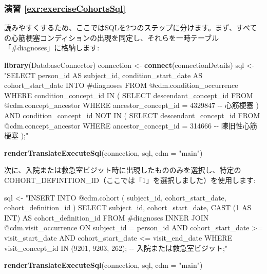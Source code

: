 \documentclass[
  11pt]{book}
\newenvironment{Shaded}{\begin{snugshade}}{\end{snugshade}}
\newcommand{\AttributeTok}[1]{\textcolor[rgb]{0.13,0.29,0.53}{#1}}
\newcommand{\FunctionTok}[1]{\textcolor[rgb]{0.13,0.29,0.53}{\textbf{#1}}}
\newcommand{\NormalTok}[1]{#1}
\newcommand{\OtherTok}[1]{\textcolor[rgb]{0.56,0.35,0.01}{#1}}
\newcommand{\StringTok}[1]{\textcolor[rgb]{0.31,0.60,0.02}{#1}}
\theoremstyle{definition}
\theoremstyle{definition}
\theoremstyle{definition}
\theoremstyle{definition}
\theoremstyle{remark}
\begin{document}
\subsubsection*{演習 \ref{exr:exerciseCohortsSql}}\label{ux6f14ux7fd2-refexrexercisecohortssql}

読みやすくするため、ここではSQLを2つのステップに分けます。まず、すべての心筋梗塞コンディションの出現を同定し、それらを一時テーブル「\#diagnoses」に格納します:

\begin{Shaded}
\begin{Highlighting}[]
\FunctionTok{library}\NormalTok{(DatabaseConnector)}
\NormalTok{connection }\OtherTok{\textless{}{-}} \FunctionTok{connect}\NormalTok{(connectionDetails)}
\NormalTok{sql }\OtherTok{\textless{}{-}} \StringTok{"SELECT person\_id AS subject\_id,}
\StringTok{  condition\_start\_date AS cohort\_start\_date}
\StringTok{INTO \#diagnoses}
\StringTok{FROM @cdm.condition\_occurrence}
\StringTok{WHERE condition\_concept\_id IN (}
\StringTok{    SELECT descendant\_concept\_id}
\StringTok{    FROM @cdm.concept\_ancestor}
\StringTok{    WHERE ancestor\_concept\_id = 4329847 {-}{-} 心筋梗塞}
\StringTok{)}
\StringTok{  AND condition\_concept\_id NOT IN (}
\StringTok{    SELECT descendant\_concept\_id}
\StringTok{    FROM @cdm.concept\_ancestor}
\StringTok{    WHERE ancestor\_concept\_id = 314666 {-}{-} 陳旧性心筋梗塞}
\StringTok{);"}

\FunctionTok{renderTranslateExecuteSql}\NormalTok{(connection, sql, }\AttributeTok{cdm =} \StringTok{"main"}\NormalTok{)}
\end{Highlighting}
\end{Shaded}

次に、入院または救急室ビジット時に出現したもののみを選択し、特定のCOHORT\_DEFINITION\_ID（ここでは「1」を選択しました）を使用します:

\begin{Shaded}
\begin{Highlighting}[]
\NormalTok{sql }\OtherTok{\textless{}{-}} \StringTok{"INSERT INTO @cdm.cohort (}
\StringTok{  subject\_id,}
\StringTok{  cohort\_start\_date,}
\StringTok{  cohort\_definition\_id}
\StringTok{  )}
\StringTok{SELECT subject\_id,}
\StringTok{  cohort\_start\_date,}
\StringTok{  CAST (1 AS INT) AS cohort\_definition\_id}
\StringTok{FROM \#diagnoses}
\StringTok{INNER JOIN @cdm.visit\_occurrence}
\StringTok{  ON subject\_id = person\_id}
\StringTok{    AND cohort\_start\_date \textgreater{}= visit\_start\_date}
\StringTok{    AND cohort\_start\_date \textless{}= visit\_end\_date}
\StringTok{WHERE visit\_concept\_id IN (9201, 9203, 262); {-}{-} 入院または救急室ビジット;"}

\FunctionTok{renderTranslateExecuteSql}\NormalTok{(connection, sql, }\AttributeTok{cdm =} \StringTok{"main"}\NormalTok{)}
\end{Highlighting}
\end{Shaded}
\end{document}

